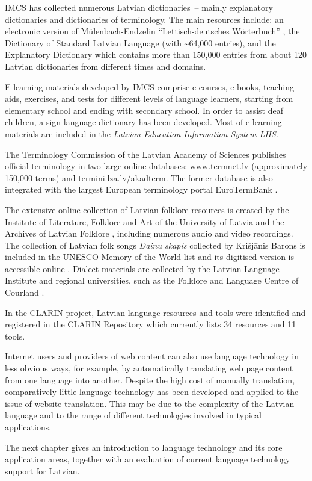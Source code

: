 \begin{multicols}{2}
IMCS has collected numerous Latvian dictionaries~-- mainly explanatory dictionaries and dictionaries of terminology.
The main resources include: an electronic version of Mülenbach-Endzelin ``Lettisch-deutsches Wörterbuch'' \cite{Meta10}, the Dictionary of Standard Latvian Language (with \~{}64,000 entries), and the Explanatory Dictionary which contains more than 150,000 entries from about 120 Latvian dictionaries from different times and domains.

E-learning materials developed by IMCS comprise e-courses, e-books, teaching aids, exercises, and tests for different levels of language learners, starting from elementary school and ending with secondary school.
In order to assist deaf children, a sign language dictionary has been developed.
Most of e-learning materials are included in the \textit{Latvian Education Information System LIIS}.

The Terminology Commission of the Latvian Academy of Sciences publishes official terminology in two large online databases: www.termnet.lv (approximately 150,000 terms) and termini.lza.lv/akadterm.
The former database is also integrated with the largest European terminology portal EuroTermBank \cite{Meta61}.

The extensive online collection of Latvian folklore resources is created by the Institute of Literature, Folklore and Art of the University of Latvia and the Archives of Latvian Folklore \cite{Meta11}, including numerous audio and video recordings.
The collection of Latvian folk songs \textit{Dainu skapis} collected by Krišjānis Barons is included in the UNESCO Memory of the World list and its digitised version is accessible online \cite{Meta12}.
Dialect materials are collected by the Latvian Language Institute and regional universities, such as the Folklore and Language Centre of Courland \cite{Meta13}.

In the CLARIN project, Latvian language resources and tools were identified and registered in the CLARIN Repository \cite{Meta14} which currently lists 34 resources and 11 tools.

Internet users and providers of web content can also use language technology in less obvious ways, for example, by automatically translating web page content from one language into another.
Despite the high cost of manually translation, comparatively little language technology has been developed and applied to the issue of website translation.
This may be due to the complexity of the Latvian language and to the range of different technologies involved in typical applications.

The next chapter gives an introduction to language technology and its core application areas, together with an evaluation of current language technology support for Latvian.

\end{multicols}


